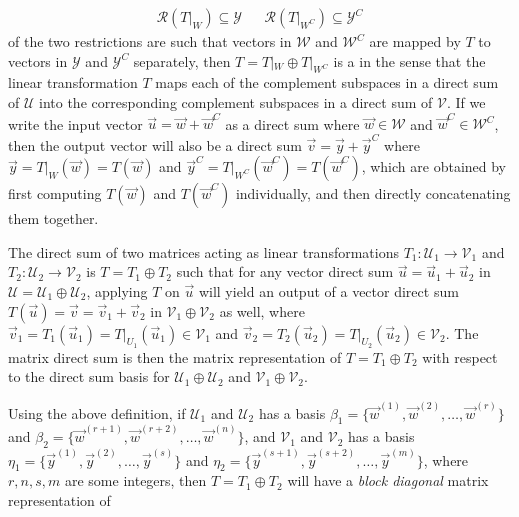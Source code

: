 \begin{align*}
\mathcal{R}(T|_W) \subseteq \mathcal{Y} & & \mathcal{R}(T|_{W^C}) \subseteq \mathcal{Y}^C
\end{align*}
of the two restrictions are such that vectors in $\mathcal{W}$ and $\mathcal{W}^C$ are mapped by $T$ to vectors in $\mathcal{Y}$ and $\mathcal{Y}^C$ separately, then $T = T|_W \oplus T|_{W^C}$ is a  in the sense that the linear transformation $T$ maps each of the complement subspaces in a direct sum of $\mathcal{U}$ into the corresponding complement subspaces in a direct sum of $\mathcal{V}$. If we write the input vector $\vec{u} = \vec{w} + \vec{w}^C$ as a direct sum where $\vec{w} \in \mathcal{W}$ and $\vec{w}^C \in \mathcal{W}^C$, then the output vector will also be a direct sum $\vec{v} = \vec{y} + \vec{y}^C$ where $\vec{y} = T|_W(\vec{w}) = T(\vec{w})$ and $\vec{y}^C = T|_{W^C}(\vec{w}^C) = T(\vec{w}^C)$, which are obtained by first computing $T(\vec{w})$ and $T(\vec{w}^C)$ individually, and then directly concatenating them together.
\begin{defn}
\label{defn:matdirectsum}
The direct sum of two matrices acting as linear transformations $T_1: \mathcal{U}_1 \to \mathcal{V}_1$ and $T_2: \mathcal{U}_2 \to \mathcal{V}_2$ is $T = T_1 \oplus T_2$ such that for any vector direct sum $\vec{u} = \vec{u}_1 + \vec{u}_2$ in $\mathcal{U} = \mathcal{U}_1 \oplus \mathcal{U}_2$, applying $T$ on $\vec{u}$ will yield an output of a vector direct sum $T(\vec{u}) = \vec{v} = \vec{v}_1 + \vec{v}_2$ in $\mathcal{V}_1 \oplus \mathcal{V}_2$ as well, where $\vec{v}_1 = T_1(\vec{u}_1) = T|_{U_1}(\vec{u}_1) \in \mathcal{V}_1$ and $\vec{v}_2 = T_2(\vec{u}_2) = T|_{U_2}(\vec{u}_2) \in \mathcal{V}_2$. The matrix direct sum is then the matrix representation of $T = T_1 \oplus T_2$ with respect to the direct sum basis for $\mathcal{U}_1 \oplus \mathcal{U}_2$ and $\mathcal{V}_1 \oplus \mathcal{V}_2$.
\end{defn}
Using the above definition, if $\mathcal{U}_1$ and $\mathcal{U}_2$ has a basis $\mathcal{\beta}_1 = \{\vec{w}^{(1)}, \vec{w}^{(2)}, \ldots, \vec{w}^{(r)}\}$ and $\mathcal{\beta}_2 = \{\vec{w}^{(r+1)}, \vec{w}^{(r+2)}, \ldots, \vec{w}^{(n)}\}$, and $\mathcal{V}_1$ and $\mathcal{V}_2$ has a basis $\mathcal{\eta}_1 = \{\vec{y}^{(1)}, \vec{y}^{(2)}, \allowbreak \ldots, \vec{y}^{(s)}\}$ and $\mathcal{\eta}_2 = \{\vec{y}^{(s+1)}, \vec{y}^{(s+2)}, \ldots, \vec{y}^{(m)}\}$, where $r, n, s, m$ are some integers, then $T = T_1 \oplus T_2$ will have a \textit{block diagonal} matrix representation of

